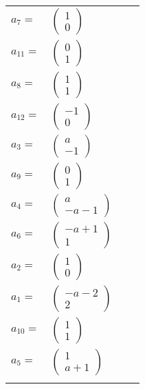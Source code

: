 \documentclass[1p]{elsarticle_modified}
\theoremstyle{definition}
\begin{document}
\begin{tabular}{m{7pt} m{180pt} m{7pt} m{180pt} }
\flushright $a_{7}=$&$\begin{pmatrix}1\\0\end{pmatrix}$ \\
\flushright $a_{11}=$&$\begin{pmatrix}0\\1\end{pmatrix}$ \\
\flushright $a_{8}=$&$\begin{pmatrix}1\\1\end{pmatrix}$ \\
\flushright $a_{12}=$&$\begin{pmatrix}-1\\0\end{pmatrix}$ \\
\flushright $a_{3}=$&$\begin{pmatrix}a\\-1\end{pmatrix}$ \\
\flushright $a_{9}=$&$\begin{pmatrix}0\\1\end{pmatrix}$ \\
\flushright $a_{4}=$&$\begin{pmatrix}a\\- a-1\end{pmatrix}$ \\
\flushright $a_{6}=$&$\begin{pmatrix}- a+1\\1\end{pmatrix}$ \\
\flushright $a_{2}=$&$\begin{pmatrix}1\\0\end{pmatrix}$ \\
\flushright $a_{1}=$&$\begin{pmatrix}- a-2\\2\end{pmatrix}$ \\
\flushright $a_{10}=$&$\begin{pmatrix}1\\1\end{pmatrix}$ \\
\flushright $a_{5}=$&$\begin{pmatrix}1\\a+1\end{pmatrix}$\\&\end{tabular}
\end{document}
